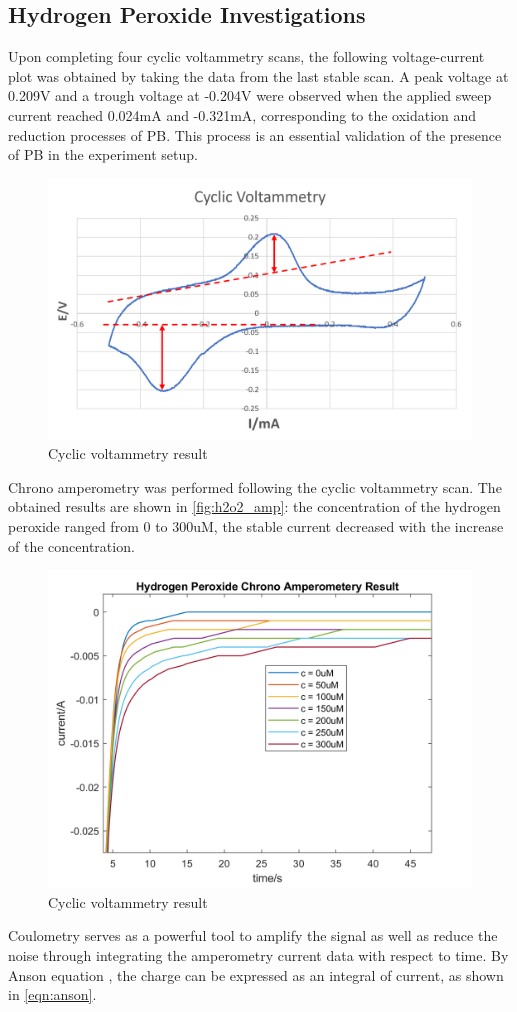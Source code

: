 \subsection{Hydrogen Peroxide Investigations}
Upon completing four cyclic voltammetry scans, the following voltage-current plot was obtained by taking the data from the last stable scan. A peak voltage at 0.209V and a trough voltage at -0.204V were observed when the applied sweep current reached 0.024mA and -0.321mA, corresponding to the oxidation and reduction processes of PB. This process is an essential validation of the presence of PB in the experiment setup.  
\begin{figure}[H]
    \centering
    \includegraphics[width=.5\textwidth]{img/h2o2_cv.png}
    \caption{Cyclic voltammetry result}
    \label{fig:h2o2_cv}
\end{figure}
\noindent Chrono amperometry was performed following the cyclic voltammetry scan. The obtained results are shown in \autoref{fig:h2o2_amp}: the concentration of the hydrogen peroxide ranged from 0 to 300uM, the stable current decreased with the increase of the concentration.
\begin{figure}[H]
    \centering
    \includegraphics[width=.5\textwidth]{img/h2o2_amp.png}
    \caption{Cyclic voltammetry result}
    \label{fig:h2o2_amp}
\end{figure}
\noindent Coulometry serves as a powerful tool to amplify the signal as well as reduce the noise through integrating the amperometry current data with respect to time. By Anson equation \cite{Anson1966}, the charge can be expressed as an integral of current, as shown in \autoref{eqn:anson}. 
